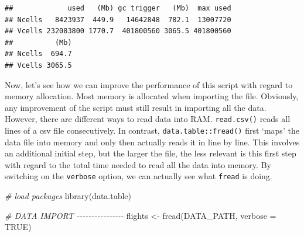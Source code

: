 \documentclass[
  12pt,
]{style/krantz}
\newenvironment{Shaded}{\begin{snugshade}}{\end{snugshade}}
\newcommand{\AttributeTok}[1]{\textcolor[rgb]{0.77,0.63,0.00}{#1}}
\newcommand{\CommentTok}[1]{\textcolor[rgb]{0.56,0.35,0.01}{\textit{#1}}}
\newcommand{\ConstantTok}[1]{\textcolor[rgb]{0.00,0.00,0.00}{#1}}
\newcommand{\FunctionTok}[1]{\textcolor[rgb]{0.00,0.00,0.00}{#1}}
\newcommand{\NormalTok}[1]{#1}
\newcommand{\OtherTok}[1]{\textcolor[rgb]{0.56,0.35,0.01}{#1}}
\begin{document}
\begin{verbatim}
##             used   (Mb) gc trigger   (Mb)  max used
## Ncells   8423937  449.9   14642848  782.1  13007720
## Vcells 232083800 1770.7  401800560 3065.5 401800560
##          (Mb)
## Ncells  694.7
## Vcells 3065.5
\end{verbatim}

Now, let's see how we can improve the performance of this script with regard to memory allocation. Most memory is allocated when importing the file. Obviously, any improvement of the script must still result in importing all the data. However, there are different ways to read data into RAM. \texttt{read.csv()} reads all lines of a csv file consecutively. In contrast, \texttt{data.table::fread()} first `maps' the data file into memory and only then actually reads it in line by line. This involves an additional initial step, but the larger the file, the less relevant is this first step with regard to the total time needed to read all the data into memory. By switching on the \texttt{verbose} option, we can actually see what \texttt{fread} is doing.

\begin{Shaded}
\begin{Highlighting}[]
\CommentTok{\# load packages}
\FunctionTok{library}\NormalTok{(data.table)}

\CommentTok{\# DATA IMPORT {-}{-}{-}{-}{-}{-}{-}{-}{-}{-}{-}{-}{-}{-}{-}{-}}
\NormalTok{flights }\OtherTok{\textless{}{-}} \FunctionTok{fread}\NormalTok{(DATA\_PATH, }\AttributeTok{verbose =} \ConstantTok{TRUE}\NormalTok{)}
\end{Highlighting}
\end{Shaded}
\end{document}
